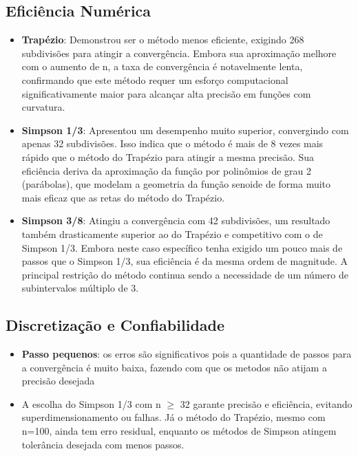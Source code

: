 \documentclass{article}
\begin{document}
\subsection*{Eficiência Numérica}
\begin{itemize}
    \item \textbf{Trapézio}: Demonstrou ser o método menos eficiente, exigindo 268 subdivisões para atingir a convergência. Embora sua aproximação melhore com o aumento de n, a taxa de convergência é notavelmente lenta, confirmando que este método requer um esforço computacional significativamente maior para alcançar alta precisão em funções com curvatura.

    \item \textbf{Simpson 1/3}: Apresentou um desempenho muito superior, convergindo com apenas 32 subdivisões. Isso indica que o método é mais de 8 vezes mais rápido que o método do Trapézio para atingir a mesma precisão. Sua eficiência deriva da aproximação da função por polinômios de grau 2 (parábolas), que modelam a geometria da função senoide de forma muito mais eficaz que as retas do método do Trapézio.

    \item \textbf{Simpson 3/8}: Atingiu a convergência com 42 subdivisões, um resultado também drasticamente superior ao do Trapézio e competitivo com o de Simpson 1/3. Embora neste caso específico tenha exigido um pouco mais de passos que o Simpson 1/3, sua eficiência é da mesma ordem de magnitude. A principal restrição do método continua sendo a necessidade de um número de subintervalos múltiplo de 3.

\end{itemize}
\subsection*{Discretização e Confiabilidade}
\begin{itemize}
    \item \textbf{Passo pequenos}: os erros são significativos pois a quantidade de passos para a convergência é muito baixa, fazendo com que os metodos não atijam a precisão desejada
    \item A escolha do Simpson 1/3 com n $\geq$ 32 garante precisão e eficiência, evitando superdimensionamento ou falhas. Já o método do Trapézio, mesmo com n=100, ainda tem erro residual, enquanto os métodos de Simpson atingem tolerância desejada com menos passos.

\end{itemize}
\end{document}
